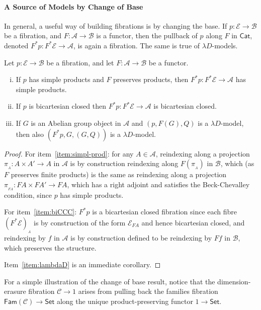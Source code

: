 \documentclass[a4paper,UKenglish]{lipics}
\theoremstyle{plain}
\newcommand{\ra}{\rightarrow}
\newcommand{\msf}[1]{\mathsf{#1}} %
\newcommand{\Set}{\msf{Set}}
\newcommand{\Cat}{\msf{Cat}}
\newcommand{\Fam}[1]{\msf{Fam}(#1)}
\newcommand{\A}{\mathcal{A}}
\newcommand{\B}{\mathcal{B}}
\newcommand{\C}{\mathcal{C}}
\newcommand{\E}{\mathcal{E}}
\newcommand{\fibre}[2]{#1_{_{#2}}}
\newcommand{\fibreE}[1]{\E_{#1}}
\begin{document}
\paragraph*{A Source of Models by Change of Base}
\label{sec:change-of-base}
In general, a useful way of building fibrations is by changing the base. If $p:\E\ra \B$ be a fibration, and $F:\A\ra \B$ is a functor, then the pullback of $p$ along $F$ in $\Cat$, denoted $F^\ast p : F^\ast \E \rightarrow \A$, is again a fibration. The same is true of $\lambda D$-models.
\begin{theorem}
\label{thm:change-of-base}
Let $p:\E\ra \B$ be a fibration, and let $F:\A\ra \B$ be a functor.
\begin{enumerate}[(i)]
\item If $p$ has simple products and $F$ preserves products,
then $F^\ast p : F^\ast \E \rightarrow \A$ has simple products.
\label{item:simpl-prod}
\item If $p$ is bicartesian closed then $F^\ast p: F^\ast \E \rightarrow \A$
is bicartesian closed.
\label{item:biCCC}
\item If $G$ is an Abelian group object in $\A$ and
  $(p,F(G),Q)$ is a $\lambda D$-model,
  then also $(F^\ast p,G,(G, Q))$ is a $\lambda D$-model.
\label{item:lambdaD}
\end{enumerate}
\end{theorem}
\begin{proof}
For item~\eqref{item:simpl-prod}: for any $A \in \A$, reindexing along a projection $\pi_{_{A}}: A \times A' \rightarrow A$ in $\A$ is by construction reindexing along $F(\pi_{_{A}})$ in $\B$, which (as $F$ preserves finite products) is the same as reindexing along a projection $\pi_{_{FA}} : FA \times FA' \rightarrow FA$, which has a right adjoint and satisfies the Beck-Chevalley condition, since $p$ has simple products.

For item~\eqref{item:biCCC}: $F^*p$ is a bicartesian closed fibration since each fibre $\fibre{(F^*\E)}{A}$ is by construction of the form $\fibreE{FA}$ and hence bicartesian closed, and reindexing by $f$ in $\A$ is by construction defined to be reindexing by $Ff$ in $\B$, which preserves the structure.

Item~\eqref{item:lambdaD} is an immediate corollary.
\end{proof}


For a simple illustration of the change of base result, notice that the dimension-erasure fibration $\C\to 1$ arises from pulling back the families fibration $\Fam\C\to\Set$ along the unique product-preserving functor $1\to\Set$.
\end{document}
